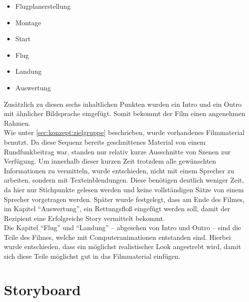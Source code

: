 \begin{itemize}
\setlength\itemsep{0pt}
\item{Flugplanerstellung}
\item{Montage}
\item{Start}
\item{Flug}
\item{Landung}
\item{Auswertung}
\end{itemize}
\noindent
Zusätzlich zu diesen sechs inhaltlichen Punkten wurden ein Intro und ein Outro mit ähnlicher Bildsprache eingefügt. Somit bekommt der Film einen angenehmen Rahmen.\\
Wie unter \autoref{sec:konzept:zielgruppe} beschrieben, wurde vorhandenes Filmmaterial benutzt. Da diese Sequenz bereits geschnittenes Material von einem Rundfunkbeitrag war, standen nur relativ kurze Ausschnitte von Szenen zur Verfügung. 
Um innerhalb dieser kurzen Zeit trotzdem alle gewünschten Informationen zu vermitteln, wurde entschieden, nicht mit einem Sprecher zu arbeiten, sondern mit Texteinblendungen. Diese benötigen deutlich weniger Zeit, da hier nur Stichpunkte gelesen werden und keine vollständigen Sätze von einem Sprecher vorgetragen werden.
Später wurde festgelegt, dass am Ende des Filmes, im Kapitel ``Auswertung'', ein Rettungsfloß eingefügt werden soll, damit der Rezipient eine Erfolgreiche Story vermittelt bekommt.\\
Die Kapitel ``Flug'' und ``Landung'' -- abgesehen von Intro und Outro -- sind die Teile des Filmes, welche mit Computeranimationen entstanden sind. Hierbei wurde entschieden, dass ein möglichst realistischer Look angestrebt wird, damit sich diese Teile möglichst gut in das Filmmaterial einfügen.

\section{Storyboard} %
\label{sec:konzept:animatic}

